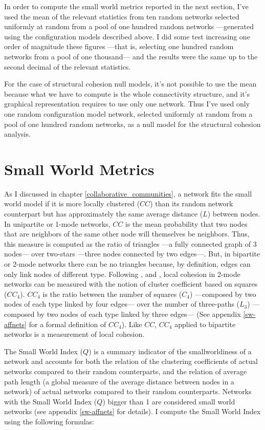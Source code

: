 In order to compute the small world metrics reported in the next section, I've used the mean of the relevant statistics from ten random networks selected uniformly at random from a pool of one hundred random networks ---generated using the configuration models described above. I did some test increasing one order of magnitude these figures ---that is, selecting one hundred random networks from a pool of one thousand--- and the results were the same up to the second decimal of the relevant statistics.

For the case of structural cohesion null models, it's not possible to use the mean because what we have to compute is the whole connectivity structure, and it's graphical representation requires to use only one network. Thus I've used only one random configuration model network, selected uniformly at random from a pool of one hundred random networks, as a null model for the structural cohesion analysis.  

\section{Small World Metrics}

As I discussed in chapter \ref{collaborative_communities}, a network fits the small world model if it is more locally clustered ($CC$) than its random network counterpart but has approximately the same average distance ($L$) between nodes. In unipartite or 1-mode networks, $CC$ is the mean probability that two nodes that are neighbors of the same other node will themselves be neighbors. Thus, this measure is computed as the ratio of triangles ---a fully connected graph of 3 nodes--- over two-stars ---three nodes connected by two edges---. But, in bipartite or 2-mode networks there can be no triangles because, by definition, edges can only link nodes of different type. Following \citet{robins:2004}, \citet{lind:2005} and \citet{latapy:2008}, local cohesion in 2-mode networks can be measured with the notion of cluster coefficient based on squares ($CC_4$). $CC_4$ is the ratio between the number of squares ($C_4$) ---composed by two nodes of each type linked by four edges--- over the number of three-paths ($L_3$) ---composed by two nodes of each type linked by three edges--- (See appendix \ref{sw-affnets} for a formal definition of $CC_4$). Like $CC$, $CC_4$ applied to bipartite networks is a measurement of local cohesion.

The Small World Index ($Q$) is a summary indicator of the smallworldiness of a network and accounts for both the relation of the clustering coefficients of actual networks compared to their random counterparts, and the relation of average path length (a global measure of the average distance between nodes in a network) of actual networks compared to their random counterparts. Networks with the Small World Index ($Q$) bigger than 1 are considered small world networks (see appendix \ref{sw-affnets} for details). I compute the Small World Index using the following formulas:

